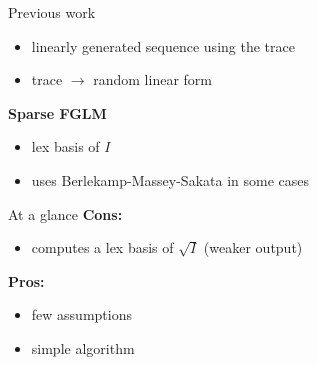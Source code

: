 \documentclass[final]{beamer}
\newlength{\sepwid}
\newlength{\onecolwid}
\newlength{\twocolwid}
\begin{document}
\begin{frame}[t]
\begin{columns}[t]
\begin{column}{\onecolwid}
\begin{alertblock}{{\sf Previous work}}
{}
\begin{itemize}
\item  {\sf linearly generated sequence using the trace}
\end{itemize}

{\sf [Bostan {\it et al.}'03]}
\begin{itemize}
\item {\sf  trace $\to$ random linear form}
\end{itemize}

{}  {\bf Sparse FGLM}
\begin{itemize}
\item {\sf lex basis of $I$}
\item {\sf uses Berlekamp-Massey-Sakata in some cases}
\end{itemize}
\end{alertblock}


\begin{alertblock}{{\sf At a glance}}
{\bf  Cons:}
\begin{itemize}
\item {\sf computes a lex basis of $\sqrt{I}$ (weaker output)}
\end{itemize}
{\bf Pros:}
\begin{itemize}
\item {\sf few assumptions}
\item {\sf simple algorithm}
\end{itemize}
\end{alertblock}

\end{column} %


\begin{column}{\sepwid}\end{column} %

\begin{column}{\twocolwid} %


\end{column}
\end{columns}
\end{frame}
\end{document}
